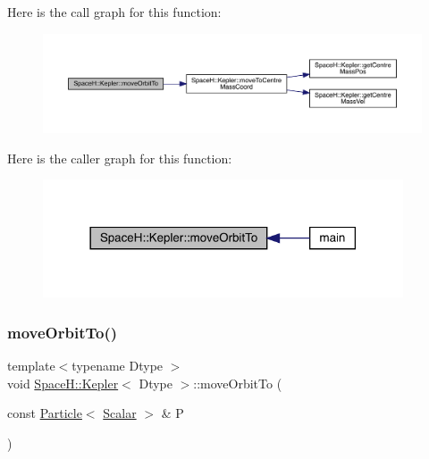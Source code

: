 Here is the call graph for this function\+:
\nopagebreak
\begin{figure}[H]
\begin{center}
\leavevmode
\includegraphics[width=350pt]{struct_space_h_1_1_kepler_a3ed7500940d6d23c878a3423a6fc24d0_cgraph}
\end{center}
\end{figure}
Here is the caller graph for this function\+:
\nopagebreak
\begin{figure}[H]
\begin{center}
\leavevmode
\includegraphics[width=302pt]{struct_space_h_1_1_kepler_a3ed7500940d6d23c878a3423a6fc24d0_icgraph}
\end{center}
\end{figure}
\mbox{\label{struct_space_h_1_1_kepler_a2a2595d386eca7c9dda35a2a4da1114f}} 
\subsubsection{\texorpdfstring{move\+Orbit\+To()}{moveOrbitTo()}\hspace{0.1cm}{\footnotesize\ttfamily [2/2]}}
{\footnotesize\ttfamily template$<$typename Dtype $>$ \\
void \mbox{\hyperlink{struct_space_h_1_1_kepler}{Space\+H\+::\+Kepler}}$<$ Dtype $>$\+::move\+Orbit\+To (\begin{DoxyParamCaption}\item[{const \mbox{\hyperlink{struct_space_h_1_1_particle}{Particle}}$<$ \mbox{\hyperlink{struct_space_h_1_1_kepler_a19291f268209f594a96fb4828fa1a54c}{Scalar}} $>$ \&}]{P }\end{DoxyParamCaption})\hspace{0.3cm}{\ttfamily [inline]}}

